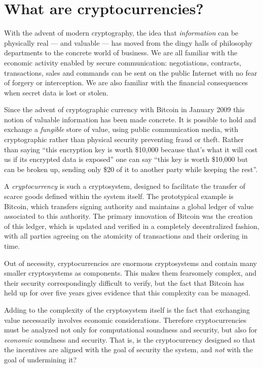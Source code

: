 \documentclass[letterpaper]{article}
\begin{document}
\section{What are cryptocurrencies?}

With the advent of modern cryptography, the idea that \emph{information} can be
physically real --- and valuable --- has moved from the dingy halls of philosophy
departments to the concrete world of business. We are all familiar with the
economic activity enabled by secure communication: negotiations, contracts,
transactions, sales and commands can be sent on the public Internet with no fear
of forgery or interception. We are also familiar with the financial consequences
when secret data is lost or stolen.

Since the advent of cryptographic currency with Bitcoin in January 2009 \cite{nakamoto2009}
this notion of valuable information has been made concrete. It is
possible to hold and exchange a \emph{fungible} store of value, using public
communication media, with cryptographic rather than physical security preventing
fraud or theft. Rather than saying ``this encryption key is worth \$10,000 because
that's what it will cost us if its encrypted data is exposed'' one can say ``this
key is worth \$10,000 but can be broken up, sending only \$20 of it to another
party while keeping the rest''.

A \emph{cryptocurrency} is such a cryptosystem, designed to facilitate the transfer
of scarce goods defined within the system itself. The prototypical example is
Bitcoin, which transfers signing authority and maintains a global ledger of value
associated to this authority. The primary innovation of Bitcoin was the creation
of this ledger, which is updated and verified in a completely decentralized
fashion, with all parties agreeing on the atomicity of transactions and their
ordering in time.

Out of necessity, cryptocurrencies are enormous cryptosystems and contain many
smaller cryptosystems as components. This makes them fearsomely complex, and
their security correspondingly difficult to verify, but the fact that Bitcoin
has held up for over five years gives evidence that this complexity can be
managed.

Adding to the complexity of the cryptosystem itself is the fact that exchanging
value necessarily involves economic considerations. Therefore cryptocurrencies
must be analyzed not only for computational soundness and security, but also
for \emph{economic} soundness and security. That is, is the cryptocurrency
designed so that the incentives are aligned with the goal of security the system,
and \emph{not} with the goal of undermining it?
\end{document}
